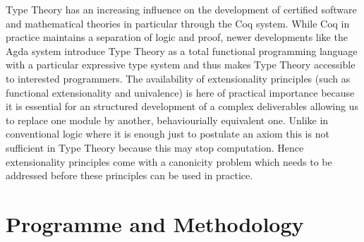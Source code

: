 \documentclass[a4paper]{article}
\begin{document}
Type Theory has an increasing influence on the development of
certified software and mathematical theories in particular through the
Coq system. While Coq in practice maintains a separation of logic and
proof, newer developments like the Agda system introduce Type Theory
as a total functional programming language with a particular
expressive type system and thus makes Type Theory accessible to
interested programmers. The availability of extensionality principles
(such as functional extensionality and univalence)
is here of practical importance because it is essential for an
structured development of a complex deliverables allowing us to 
replace one module by another, behaviourially equivalent one.
Unlike in conventional logic where it is enough just to postulate an
axiom this is not sufficient in Type Theory because this may stop
computation. Hence extensionality principles come with a canonicity
problem which needs to be addressed before these principles can be used
in practice. 








\section{Programme and Methodology}
\end{document}
